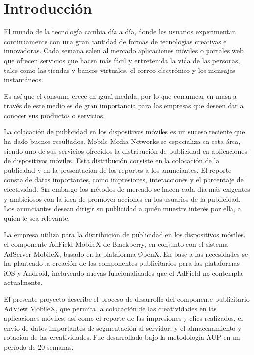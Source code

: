 
\chapter*{{\large Introducción}}

%
\foreignlanguage{spanish}{\thispagestyle{empty} }

%
El mundo de la tecnología cambia día a día, donde los usuarios experimentan
continuamente con una gran cantidad de formas de tecnologías creativas
e innovadoras. Cada semana salen al mercado aplicaciones móviles o
portales web que ofrecen servicios que hacen más fácil y entretenida
la vida de las personas, tales como las tiendas y bancos virtuales,
el correo electrónico y los mensajes instantáneos.

Es así que el consumo crece en igual medida, por lo que comunicar
en masa a través de este medio es de gran importancia para las empresas
que deseen dar a conocer sus productos o servicios. 

La colocación de publicidad en los dispositivos móviles es un suceso
reciente que ha dado buenos resultados. Mobile Media Networks se especializa
en esta área, siendo uno de sus servicios ofrecidos la distribución
de publicidad en aplicaciones de dispositivos móviles. Esta distribución
consiste en la colocación de la publicidad y en la presentación de
los reportes a los anunciantes. El reporte consta de datos importantes,
como impresiones, interacciones y el porcentaje de efectividad. Sin
embargo los métodos de mercado se hacen cada día más exigentes y ambiciosos
con la idea de promover acciones en los usuarios de la publicidad.
Los anunciantes desean dirigir su publicidad a quién muestre interés
por ella, a quien le sea relevante.

La empresa utiliza para la distribución de publicidad en los dispositivos
móviles, el componente AdField MobileX de Blackberry, en conjunto
con el sistema AdServer MobileX, basado en la plataforma OpenX. En
base a las necesidades se ha planteado la creación de los componentes
publicitarios para las plataformas iOS y Android, incluyendo nuevas
funcionalidades que el AdField no contempla actualmente.

El presente proyecto describe el proceso de desarrollo del componente
publicitario AdView MobileX, que permita la colocación de las creatividades
en las aplicaciones móviles, así como el reporte de las impresiones
y clics realizados, el envío de datos importantes de segmentación
al servidor, y el almacenamiento y rotación de las creatividades.
Fue desarrollado bajo la metodología AUP en un período de 20 semanas.

